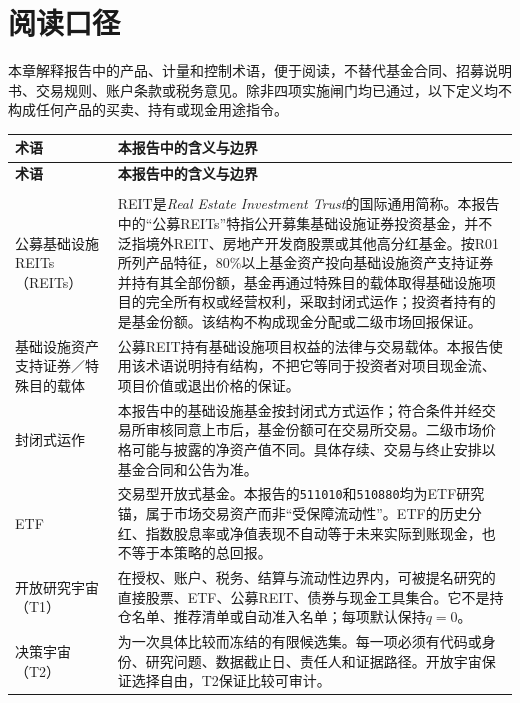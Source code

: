 \section{阅读口径}

本章解释报告中的产品、计量和控制术语，便于阅读，不替代基金合同、招募说明书、交易规则、账户条款或税务意见。除非四项实施闸门均已通过，以下定义均不构成任何产品的买卖、持有或现金用途指令。

\footnotesize
\begin{longtable}{p{2.9cm}p{7.2cm}}
\toprule
\textbf{术语} & \textbf{本报告中的含义与边界} \\
\midrule
\endfirsthead
\toprule
\textbf{术语} & \textbf{本报告中的含义与边界} \\
\midrule
\endhead
\bottomrule
\endfoot

\multicolumn{2}{l}{\textbf{产品与持有结构}} \\
\addlinespace[0.25em]
公募基础设施REITs（REITs） & REIT是\textit{Real Estate Investment Trust}的国际通用简称。本报告中的“公募REITs”特指公开募集基础设施证券投资基金，并不泛指境外REIT、房地产开发商股票或其他高分红基金。按R01所列产品特征，80\%以上基金资产投向基础设施资产支持证券并持有其全部份额，基金再通过特殊目的载体取得基础设施项目的完全所有权或经营权利，采取封闭式运作；投资者持有的是基金份额。该结构不构成现金分配或二级市场回报保证。 \\

基础设施资产支持证券／特殊目的载体 & 公募REIT持有基础设施项目权益的法律与交易载体。本报告使用该术语说明持有结构，不把它等同于投资者对项目现金流、项目价值或退出价格的保证。 \\

封闭式运作 & 本报告中的基础设施基金按封闭式方式运作；符合条件并经交易所审核同意上市后，基金份额可在交易所交易。二级市场价格可能与披露的净资产值不同。具体存续、交易与终止安排以基金合同和公告为准。 \\

ETF & 交易型开放式基金。本报告的\texttt{511010}和\texttt{510880}均为ETF研究锚，属于市场交易资产而非“受保障流动性”。ETF的历史分红、指数股息率或净值表现不自动等于未来实际到账现金，也不等于本策略的总回报。 \\

开放研究宇宙（T1） & 在授权、账户、税务、结算与流动性边界内，可被提名研究的直接股票、ETF、公募REIT、债券与现金工具集合。它不是持仓名单、推荐清单或自动准入名单；每项默认保持\(q=0\)。 \\

决策宇宙（T2） & 为一次具体比较而冻结的有限候选集。每一项必须有代码或身份、研究问题、数据截止日、责任人和证据路径。开放宇宙保证选择自由，T2保证比较可审计。 \\


\end{longtable}
